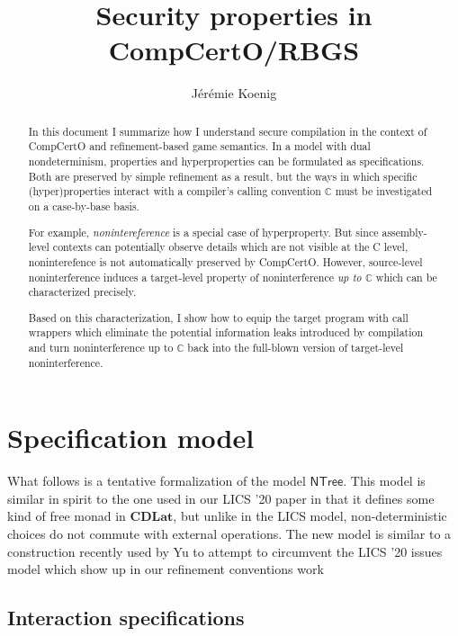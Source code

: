 \documentclass[11pt]{article}
\title{Security properties in CompCertO/RBGS}
\author{J\'er\'emie Koenig}
\begin{document}
\maketitle

\begin{abstract} %
In this document I summarize how I understand
secure compilation
in the context of CompCertO and refinement-based game semantics.
In a model with dual nondeterminism,
properties and hyperproperties
can be formulated as specifications.
Both are preserved by simple refinement as a result,
but the ways in which specific (hyper)properties interact with
a compiler's calling convention $\mathbb{C}$
must be investigated on a case-by-base basis.

For example, \emph{nonintereference} is
a special case of hyperproperty.
But since assembly-level contexts can potentially observe details
which are not visible at the C level,
noninterefence is not automatically preserved by CompCertO.
However,
source-level noninterference induces a target-level property
of noninterference \emph{up to $\mathbb{C}$}
which can be characterized precisely.

Based on this characterization,
I show how to equip the target program
with call wrappers which eliminate
the potential information leaks introduced by compilation
and turn noninterference up to $\mathbb{C}$
back into the full-blown version of target-level noninterference.
\end{abstract}

\section{Specification model} %

What follows is a tentative formalization of the model $\mathsf{NTree}$.
This model is similar in spirit to the one used in our LICS '20 paper
in that it defines some kind of free monad in $\mathbf{CDLat}$,
but unlike in the LICS model,
non-deterministic choices do not commute with external operations.
The new model is similar to a construction recently used by Yu
to attempt to circumvent the LICS '20 issues model
which show up in our refinement conventions work

\subsection{Interaction specifications} %
\end{document}
